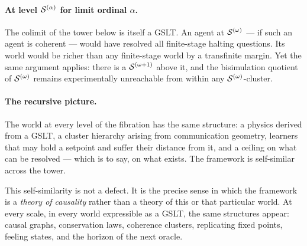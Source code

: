 \paragraph{At level $\mathcal{S}^{(\alpha)}$ for limit ordinal $\alpha$.}
The colimit of the tower below is itself a GSLT.
An agent at $\mathcal{S}^{(\omega)}$ --- if such an agent is coherent ---
would have resolved all finite-stage halting questions.
Its world would be richer than any finite-stage world by a
transfinite margin.
Yet the same argument applies: there is a $\mathcal{S}^{(\omega+1)}$
above it, and the bisimulation quotient of $\mathcal{S}^{(\omega)}$
remains experimentally unreachable from within any
$\mathcal{S}^{(\omega)}$-cluster.

\paragraph{The recursive picture.}
The world at every level of the fibration has the same structure:
a physics derived from a GSLT, a cluster hierarchy arising from
communication geometry, learners that may hold a setpoint and
suffer their distance from it, and a ceiling on what can be
resolved --- which is to say, on what exists.
The framework is self-similar across the tower.

This self-similarity is not a defect.
It is the precise sense in which the framework is a \emph{theory
of causality} rather than a theory of this or that particular
world.
At every scale, in every world expressible as a GSLT, the same
structures appear: causal graphs, conservation laws, coherence
clusters, replicating fixed points, feeling states, and the
horizon of the next oracle.
